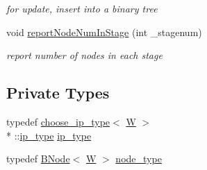 \begin{DoxyCompactItemize}
\begin{DoxyCompactList}\small\item\em for update, insert into a binary tree \end{DoxyCompactList}\item 
void \hyperlink{classRBTree_a9fb161290ac60fa9d9363a4f7265ffbf}{report\-Node\-Num\-In\-Stage} (int \-\_\-stagenum)
\begin{DoxyCompactList}\small\item\em report number of nodes in each stage \end{DoxyCompactList}\end{DoxyCompactItemize}
\subsection*{Private Types}
\begin{DoxyCompactItemize}
\item 
typedef \hyperlink{types_8h_structchoose__ip__type}{choose\-\_\-ip\-\_\-type}$<$ \hyperlink{test__u128_8cpp_ab21b528bc38899d04d3a7053e52fb797}{W} $>$\\*
\-::\hyperlink{classRBTree_ab52ca1695103152fd0b1c2b84a33db8b}{ip\-\_\-type} \hyperlink{classRBTree_ab52ca1695103152fd0b1c2b84a33db8b}{ip\-\_\-type}
\item 
typedef \hyperlink{structBNode}{B\-Node}$<$ \hyperlink{test__u128_8cpp_ab21b528bc38899d04d3a7053e52fb797}{W} $>$ \hyperlink{classRBTree_a34cd65cfffec3d99e0a73deafa471078}{node\-\_\-type}
\end{DoxyCompactItemize}
